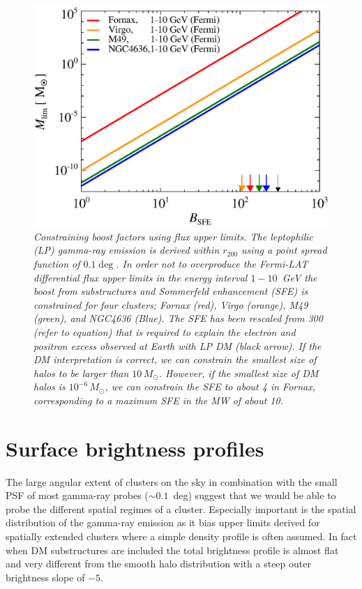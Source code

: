 \documentclass[10pt,aps,pra,reprint,amsmath,amsfonts,amssymb,showpacs]{revtex4-1}
\newcommand{\msun}{M_\odot}
\newcommand{\rvir}{r_{200}}
\begin{document}
\begin{figure}%
 \includegraphics[width=0.99\columnwidth]{figures/LP.const.diff.v11.0.1deg.1.6T.SubMass.SF300.IR2.noMW.woGal.eps}
\caption{\it Constraining boost factors using flux upper limits. The
  leptophilic (LP) gamma-ray emission is derived within $\rvir$ using
  a point spread function of $0.1\deg$. In order not to overproduce
  the Fermi-LAT differential flux upper limits in the energy interval
  $1-10$~GeV the boost from substructures and Sommerfeld enhancement
  (SFE) is constrained for four clusters; Fornax (red), Virgo
  (orange), M49 (green), and NGC4636 (Blue). The SFE has been rescaled
  from 300 (refer to equation) that is required to explain the
  electron and positron excess observed at Earth with LP DM (black
  arrow). If the DM interpretation is correct, we can constrain the
  smallest size of halos to be larger than $10\,\msun$. However, if
  the smallest size of DM halos is $10^{-6}\,\msun$, we can constrain
  the SFE to about 4 in Fornax, corresponding to a maximum SFE in the
  MW of about 10.}
 \label{fig:boost_const}
\end{figure}


\section{Surface brightness profiles}
\label{sect:spatial}
The large angular extent of clusters on the sky in combination with
the small PSF of most gamma-ray probes ($\sim 0.1$~deg) suggest that
we would be able to probe the different spatial regimes of a
cluster. Especially important is the spatial distribution of the
gamma-ray emission as it bias upper limits derived for spatially
extended clusters where a simple density profile is often assumed. In
fact when DM substructures are included the total brightness profile
is almost flat and very different from the smooth halo distribution
with a steep outer brightness slope of $-5$.
\end{document}
